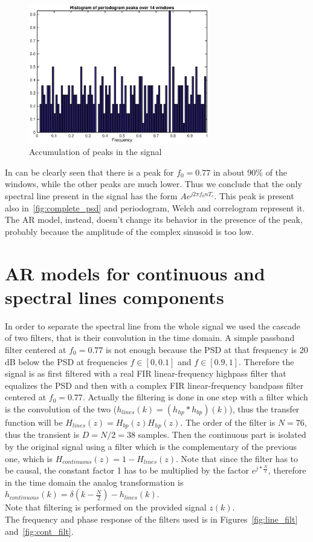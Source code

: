 \documentclass[10pt]{article}
\numberwithin{equation}{section}
\begin{document}
\begin{figure}[h!]
  \centering
  \includegraphics[width = 0.7\textwidth]{images/period_acc}
  \caption{Accumulation of peaks in the signal}
  \label{fig:peak_acc}
\end{figure}

In can be clearly seen that there is a peak for $f_0 = 0.77$ in about 90\% of the windows, while the other peaks are much lower. Thus we conclude that the only spectral line present in the signal has the form $A e^{j 2 \pi f_0 n T_c}$. This peak is present also in~\ref{fig:complete_psd} and periodogram, Welch and correlogram represent it. The AR model, instead, doesn't change its behavior in the presence of the peak, probably because the amplitude of the complex sinusoid is too low.

\section{AR models for continuous and spectral lines components}
In order to separate the spectral line from the whole signal we used the cascade of two filters, that is their convolution in the time domain. A simple passband filter centered at $f_0 = 0.77$ is not enough because the PSD at that frequency is 20 dB below the PSD at frequencies $f \in [0, 0.1]$ and $f \in [0.9, 1]$. Therefore the signal is as first filtered with a real FIR linear-frequency highpass filter that equalizes the PSD and then with a complex FIR linear-frequency bandpass filter centered at $f_0 = 0.77$. Actually the filtering is done in one step with a filter which is the convolution of the two ($h_{lines}(k) = (h_{hp}*h_{bp})(k)$), thus the transfer function will be $H_{lines}(z) = H_{bp}(z)H_{hp}(z)$. The order of the filter is $N = 76$, thus the transient is $D = N/2 = 38$ samples. Then the continuous part is isolated by the original signal using a filter which is the complementary of the previous one, which is $H_{continuous}(z)= 1 - H_{lines}(z)$. Note that since the filter has to be causal, the constant factor 1 has to be multiplied by the factor $e^{j*\frac{N}{2}}$, therefore in the time domain the analog transformation is $h_{continuous}(k) = \delta(k - \frac{N}{2}) - h_{lines}(k)$. \\
Note that filtering is performed on the provided signal $z(k)$. \\
The frequency and phase response of the filters used is in Figures~\ref{fig:line_filt} and~\ref{fig:cont_filt}.\\
\end{document}
